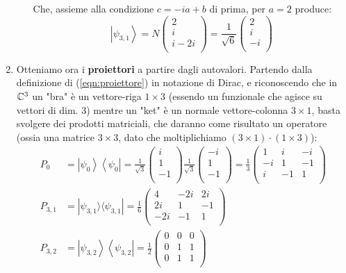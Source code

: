 \begin{enumerate}
\begin{itemize}
\[	\]
	Che, assieme alla condizione $c=-ia+b$ di prima, per $a=2$ produce:
	\[
	\left|\psi_{3,1}\right\rangle=N\left(\begin{matrix}2\\i\\i-2i\\\end{matrix}\right)=\frac{1}{\sqrt6}\left(\begin{matrix}2\\i\\-i\\\end{matrix}\right)
	\]
\end{itemize}
\item Otteniamo ora i \textbf{proiettori} a partire dagli autovalori. Partendo dalla definizione di (\ref{eqn:proiettore}) in notazione di Dirac, e riconoscendo che in $\mathbb{C}^3$ un "bra" è un vettore-riga $1\times 3$ (essendo un funzionale che agisce su vettori di dim. 3) mentre un "ket" è un normale vettore-colonna $3\times 1$, basta svolgere dei prodotti matriciali, che daranno come risultato un operatore (ossia una matrice $3\times 3$, dato che moltiplichiamo $(3\times 1) \cdot (1\times 3)$):
\begin{align*}
	P_0&=\left|\psi_0\right\rangle\left\langle\psi_0\right|=\frac{1}{\sqrt3}\left(\begin{matrix}i\\1\\-1\\\end{matrix}\right)\frac{1}{\sqrt3}\left(\begin{matrix}-i\\1\\-1\\\end{matrix}\right)=\frac{1}{3}\left(\begin{matrix}1&i&-i\\-i&1&-1\\i&-1&1\\\end{matrix}\right)\\
	P_{3,1}&=|\psi_{3,1}\rangle \langle \psi_{3,1}|=\frac{1}{6}\left(\begin{matrix}4&-2i&2i\\2i&1&-1\\-2i&-1&1\\\end{matrix}\right)\\
	P_{3,2}&=\left|\psi_{3,2}\right\rangle\left\langle\psi_{3,2}\right|=\frac{1}{2}\left(\begin{matrix}0&0&0\\0&1&1\\0&1&1\\\end{matrix}\right)

\end{align*}
\end{enumerate}
